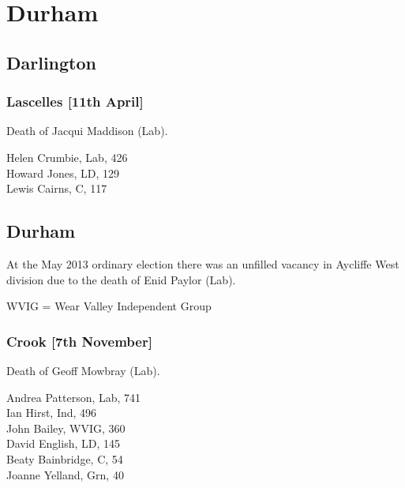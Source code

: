 \documentclass[a4paper,openany,10pt]{book}
\begin{document}
\vfill

\section{Durham}

\subsection*{Darlington}

\subsubsection*{Lascelles \hspace*{\fill}\nolinebreak[1]%
\enspace\hspace*{\fill}
[11th April]}


Death of Jacqui Maddison (Lab).



Helen Crumbie, Lab, 426\\
Howard Jones, LD, 129\\
Lewis Cairns, C, 117\\


\subsection*{Durham}

At the May 2013 ordinary election there was an unfilled vacancy in Aycliffe West division due to the death of Enid Paylor (Lab).

WVIG = Wear Valley Independent Group


\subsubsection*{Crook \hspace*{\fill}\nolinebreak[1]%
\enspace\hspace*{\fill}
[7th November]}


Death of Geoff Mowbray (Lab).



Andrea Patterson, Lab, 741\\
Ian Hirst, Ind, 496\\
John Bailey, WVIG, 360\\
David English, LD, 145\\
Beaty Bainbridge, C, 54\\
Joanne Yelland, Grn, 40\\
\end{document}
